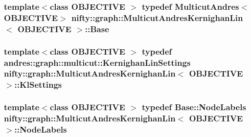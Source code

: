 \subsubsection[{Base}]{\setlength{\rightskip}{0pt plus 5cm}template$<$class O\+B\+J\+E\+C\+T\+I\+V\+E $>$ typedef {\bf Multicut\+Andres}$<$O\+B\+J\+E\+C\+T\+I\+V\+E$>$ {\bf nifty\+::graph\+::\+Multicut\+Andres\+Kernighan\+Lin}$<$ O\+B\+J\+E\+C\+T\+I\+V\+E $>$\+::{\bf Base}}\label{classnifty_1_1graph_1_1MulticutAndresKernighanLin_afd96990e2ad7afe119cd7a5bc633c0ba}
\hypertarget{classnifty_1_1graph_1_1MulticutAndresKernighanLin_ad9c1a43deea51a0a54ade95d18397ff9}{}
\subsubsection[{Kl\+Settings}]{\setlength{\rightskip}{0pt plus 5cm}template$<$class O\+B\+J\+E\+C\+T\+I\+V\+E $>$ typedef andres\+::graph\+::multicut\+::\+Kernighan\+Lin\+Settings {\bf nifty\+::graph\+::\+Multicut\+Andres\+Kernighan\+Lin}$<$ O\+B\+J\+E\+C\+T\+I\+V\+E $>$\+::{\bf Kl\+Settings}}\label{classnifty_1_1graph_1_1MulticutAndresKernighanLin_ad9c1a43deea51a0a54ade95d18397ff9}
\hypertarget{classnifty_1_1graph_1_1MulticutAndresKernighanLin_a7f60a40875a941835d767b510e0b513e}{}
\subsubsection[{Node\+Labels}]{\setlength{\rightskip}{0pt plus 5cm}template$<$class O\+B\+J\+E\+C\+T\+I\+V\+E $>$ typedef {\bf Base\+::\+Node\+Labels} {\bf nifty\+::graph\+::\+Multicut\+Andres\+Kernighan\+Lin}$<$ O\+B\+J\+E\+C\+T\+I\+V\+E $>$\+::{\bf Node\+Labels}}\label{classnifty_1_1graph_1_1MulticutAndresKernighanLin_a7f60a40875a941835d767b510e0b513e}
\hypertarget{classnifty_1_1graph_1_1MulticutAndresKernighanLin_a3c8e32ae3cc9b303101a00b46538c63c}{}
